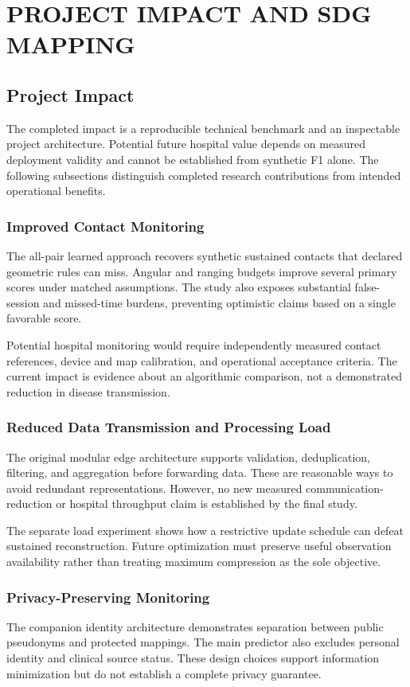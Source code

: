 \documentclass[12pt,a4paper]{report}
\begin{document}
\chapter{PROJECT IMPACT AND SDG MAPPING}

\section{Project Impact}
The completed impact is a reproducible technical benchmark and an inspectable project architecture. Potential future hospital value depends on measured deployment validity and cannot be established from synthetic F1 alone. The following subsections distinguish completed research contributions from intended operational benefits.

\subsection{Improved Contact Monitoring}
The all-pair learned approach recovers synthetic sustained contacts that declared geometric rules can miss. Angular and ranging budgets improve several primary scores under matched assumptions. The study also exposes substantial false-session and missed-time burdens, preventing optimistic claims based on a single favorable score.

Potential hospital monitoring would require independently measured contact references, device and map calibration, and operational acceptance criteria. The current impact is evidence about an algorithmic comparison, not a demonstrated reduction in disease transmission.

\subsection{Reduced Data Transmission and Processing Load}
The original modular edge architecture supports validation, deduplication, filtering, and aggregation before forwarding data. These are reasonable ways to avoid redundant representations. However, no new measured communication-reduction or hospital throughput claim is established by the final study.

The separate load experiment shows how a restrictive update schedule can defeat sustained reconstruction. Future optimization must preserve useful observation availability rather than treating maximum compression as the sole objective.

\subsection{Privacy-Preserving Monitoring}
The companion identity architecture demonstrates separation between public pseudonyms and protected mappings. The main predictor also excludes personal identity and clinical source status. These design choices support information minimization but do not establish a complete privacy guarantee.
\end{document}
